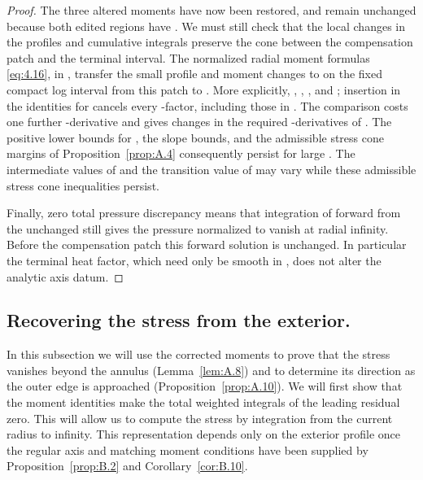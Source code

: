 \begin{proof}
The three altered moments have now been restored, and  remain unchanged because both edited regions
have . We must still check that the local changes in the profiles and cumulative integrals preserve the
cone between the compensation patch and the terminal interval. The normalized radial moment formulas \eqref{eq:4.16}, in
, transfer the small profile and moment changes to  on the fixed compact
log interval from this patch to . More explicitly,
,
,
, and
; insertion in the identities for
 cancels every -factor, including those in
. The comparison costs one further -derivative and gives
 changes in the required -derivatives of
. The positive lower bounds for , the slope bounds, and the admissible
stress cone margins of Proposition~\ref{prop:A.4} consequently persist for large . The intermediate
values of  and the transition value of  may vary while these admissible stress cone
inequalities persist.

Finally, zero total pressure discrepancy means that integration of
 forward from the unchanged  still gives the pressure normalized to
vanish at radial infinity. Before the compensation patch this forward solution is unchanged. In particular the terminal heat
factor, which need only be smooth in , does not alter the analytic axis datum.
\end{proof}

\subsection{Recovering the stress from the exterior.}\label{sec:A.7}
In this subsection we will use the corrected moments to prove that the stress vanishes beyond the annulus
(Lemma~\ref{lem:A.8}) and to determine its direction as the outer edge is approached
(Proposition~\ref{prop:A.10}). We will first show that the moment identities make the total weighted integrals of the leading
residual zero. This will allow us to compute the stress by integration from the current radius to infinity. This representation
depends only on the exterior profile once the regular axis and matching moment conditions have been supplied by
Proposition~\ref{prop:B.2} and Corollary~\ref{cor:B.10}.

